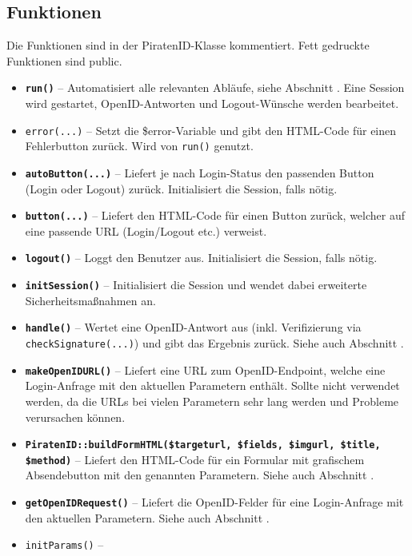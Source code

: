 \subsection{Funktionen}
Die Funktionen sind in der PiratenID-Klasse kommentiert. Fett gedruckte Funktionen sind public.
\begin{itemize}
	\item \textbf{\texttt{run()}} --
		Automatisiert alle relevanten Abläufe, siehe Abschnitt .
		Eine Session wird gestartet, OpenID-Antworten und Logout-Wünsche werden bearbeitet.
	\item \texttt{error(...)} --
		Setzt die \$error-Variable und gibt den HTML-Code für einen Fehlerbutton zurück. Wird von \texttt{run()} genutzt.
	\item \textbf{\texttt{autoButton(...)}} --
		Liefert je nach Login-Status den passenden Button (Login oder Logout) zurück. Initialisiert die Session, falls nötig.
	\item \textbf{\texttt{button(...)}} --
		Liefert den HTML-Code für einen Button zurück, welcher auf eine passende URL (Login/Logout etc.) verweist.
	\item \textbf{\texttt{logout()}} --
		Loggt den Benutzer aus. Initialisiert die Session, falls nötig.
	\item \textbf{\texttt{initSession()}} --
		Initialisiert die Session und wendet dabei erweiterte Sicherheitsmaßnahmen an.
	\item \textbf{\texttt{handle()}} --
		Wertet eine OpenID-Antwort aus (inkl. Verifizierung via \texttt{checkSignature(...)}) und gibt das Ergebnis zurück.
		Siehe auch Abschnitt  .
	\item \textbf{\texttt{makeOpenIDURL()}} --
		Liefert eine URL zum OpenID-Endpoint, welche eine Login-Anfrage mit den aktuellen Parametern enthält.
		Sollte nicht verwendet werden, da die URLs bei vielen Parametern sehr lang werden und Probleme verursachen können.
	\item \textbf{\texttt{PiratenID::buildFormHTML(\$targeturl, \$fields, \$imgurl, \$title, \$method)}} --
		Liefert den HTML-Code für ein Formular mit grafischem Absendebutton mit den genannten Parametern.
		Siehe auch Abschnitt  .
	\item \textbf{\texttt{getOpenIDRequest()}} --
		Liefert die OpenID-Felder für eine Login-Anfrage mit den aktuellen Parametern.
		Siehe auch Abschnitt  .
	\item \texttt{initParams()} --

\end{itemize}
